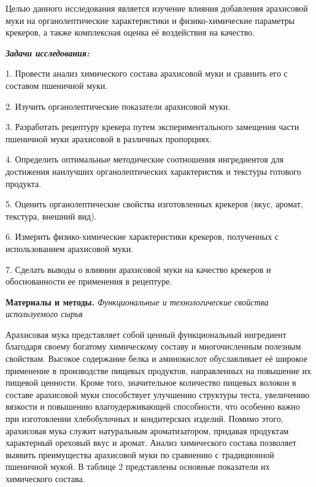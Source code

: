 \begin{multicols}{2}
Целью данного исследования является изучение влияния добавления
арахисовой муки на органолептические характеристики и физико-химические
параметры крекеров, а также комплексная оценка её воздействия на
качество.

\emph{{\bfseries Задачи исследования:}}

1. Провести анализ химического состава арахисовой муки и сравнить его с
составом пшеничной муки.

2. Изучить органолептические показатели арахисовой муки.

3. Разработать рецептуру крекера путем экспериментального замещения
части пшеничной муки арахисовой в различных пропорциях.

4. Определить оптимальные методические соотношения ингредиентов для
достижения наилучших органолептических характеристик и текстуры готового
продукта.

5. Оценить органолептические свойства изготовленных крекеров (вкус,
аромат, текстура, внешний вид).

6. Измерить физико-химические характеристики крекеров, полученных с
использованием арахисовой муки.

7. Сделать выводы о влиянии арахисовой муки на качество крекеров и
обоснованности ее применения в рецептуре.

{\bfseries Материалы и методы.} \emph{Функциональные и технологические
свойства используемого сырья}

Арахисовая мука представляет собой ценный функциональный ингредиент
благодаря своему богатому химическому составу и многочисленным полезным
свойствам. Высокое содержание белка и аминокислот обуславливает её
широкое применение в производстве пищевых продуктов, направленных на
повышение их пищевой ценности. Кроме того, значительное количество
пищевых волокон в составе арахисовой муки способствует улучшению
структуры теста, увеличению вязкости и повышению влагоудерживающей
способности, что особенно важно при изготовлении хлебобулочных и
кондитерских изделий. Помимо этого, арахисовая мука служит натуральным
ароматизатором, придавая продуктам характерный ореховый вкус и аромат.
Анализ химического состава позволяет выявить преимущества арахисовой
муки по сравнению с традиционной пшеничной мукой. В таблице 2
представлены основные показатели их химического состава.
\end{multicols}

